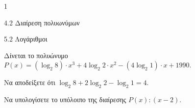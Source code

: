 \begin{ylh}{1}
\item 4.2 Διαίρεση πολυωνύμων
\item 5.2 Λογάριθμοι
\end{ylh}
Δίνεται το πολυώνυμο $P(x) = (\log_2 8) \cdot x^3 + 4\log_2 2 \cdot x^2 - (4\log_2 1) \cdot x + 1990$.
\begin{alist}
\item Να αποδείξετε ότι $\log_2 8 + 2\log_2 2 - \log_2 1 = 4$.
\item Να υπολογίσετε το υπόλοιπο της διαίρεσης $P(x) : (x - 2)$.
\end{alist}

